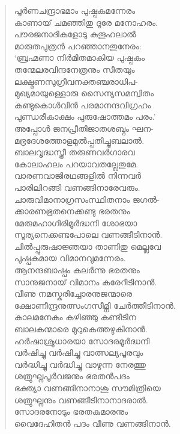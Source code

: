 \begin{verse}
പൂര്‍ണചന്ദ്രാഭമാം പുഷ്പകമന്നേരം\\
കാണായ് ചമഞ്ഞിതു ദൂരേ മനോഹരം.\\
പൗരജനാദികളോടു കുതൂഹലാല്‍\\
മാരുതപുത്രന്‍ പറഞ്ഞാനതുനേരം:\\
‘ബ്രഹ്മണാ നിര്‍മിതമാകിയ പുഷ്പകം\\
തന്മേലരവിന്ദനേത്രനും സീതയും\\
ലക്ഷ്മണസുഗ്രീവനക്തഞ്ചരാധിപ-\\
മുഖ്യമായുള്ളൊരു സൈന്യസമന്വിതം\\
കണ്ടുകൊള്‍വിന്‍ പരമാനന്ദവിഗ്രഹം\\
പുണ്ഡരീകാക്ഷം പുരുഷോത്തമം പരം.’\\
അപ്പോള്‍ ജനപ്രീതിജാതശബ്ദം ഘന-\\
മഭ്രദേശത്തോളമുല്‍പ്പതിച്ചൂബലാല്‍.\\
ബാലവൃദ്ധസ്ത്രീ തരുണവര്‍ഗാരവ\\
കോലാഹലം പറയാവതല്ലേതുമേ.\\
വാരണവാജിരഥങ്ങളില്‍ നിന്നവര്‍\\
പാരിലിറങ്ങി വണങ്ങിനാരേവരും.\\
ചാരുവിമാനാഗ്രസംസ്ഥിതനാം ജഗല്‍-\\
ക്കാരണഭൂതനെക്കണ്ടു ഭരതനും\\
മേരുമഹാഗിരിമൂര്‍ദ്ധനി ശോഭയാ\\
സൂര്യനെക്കണ്ടപോലെ വണങ്ങീടിനാന്‍.\\
ചില്‍പ്പുരുഷാജ്ഞയാ താണിതു മെല്ലവേ\\
പുഷ്പകമായ വിമാനവുമന്നേരം.\\
ആനന്ദബാഷ്പം കലര്‍ന്നു ഭരതനും\\
സാനുജനായ് വിമാനം കരേറീടിനാന്‍.\\
വീണു നമസ്കരിച്ചോരനുജന്മാരെ\\
ക്ഷോണീന്ദ്രനുത്സംഗസീമ്നി ചേര്‍ത്തീടിനാന്‍.\\
കാലമനേകം കഴിഞ്ഞു കണ്ടീടിന\\
ബാലകന്മാരെ മുറുകെത്തഴുകിനാന്‍.\\
ഹര്‍ഷാശ്രുധാരയാ സോദരമൂര്‍ദ്ധനി\\
വര്‍ഷിച്ചു വര്‍ഷിച്ചു വാത്സല്യപൂരവും\\
വര്‍ദ്ധിച്ചു വര്‍ദ്ധിച്ചു വാഴുന്ന നേരത്തു\\
ശത്രുഘ്നപൂര്‍വജനും ഭരതന്‍പദം\\
ഭക്ത്യാ വണങ്ങിനാനാശു സൗമിത്രിയെ\\
ശത്രുഘ്നനും വണങ്ങീടിനാനാദരാല്‍.\\
സോദരനോടും ഭരതകുമാരനും\\
വൈദേഹിതന്‍ പദം വീണു വണങ്ങിനാന്‍.\\

\end{verse}
